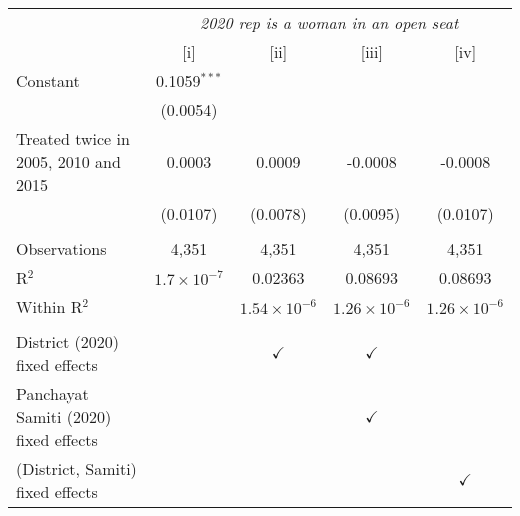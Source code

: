 
\begingroup
\centering
\begin{tabular}{lcccc}
   \toprule
    & \multicolumn{4}{c}{\textit{2020 rep is a woman in an open seat}}\\
                                         & [i]                  & [ii]                  & [iii]                 & [iv]\\  
   \midrule 
   Constant                              & 0.1059$^{***}$       &                       &                       &   \\   
                                         & (0.0054)             &                       &                       &   \\   
   Treated twice in 2005, 2010 and 2015  & 0.0003               & 0.0009                & -0.0008               & -0.0008\\   
                                         & (0.0107)             & (0.0078)              & (0.0095)              & (0.0107)\\   
    \\
   Observations                          & 4,351                & 4,351                 & 4,351                 & 4,351\\  
   R$^2$                                 & $1.7\times 10^{-7}$  & 0.02363               & 0.08693               & 0.08693\\  
   Within R$^2$                          &                      & $1.54\times 10^{-6}$  & $1.26\times 10^{-6}$  & $1.26\times 10^{-6}$\\   
    \\
   District (2020) fixed effects         &                      & $\checkmark$          & $\checkmark$          & \\  
   Panchayat Samiti (2020) fixed effects &                      &                       & $\checkmark$          & \\  
   (District, Samiti) fixed effects      &                      &                       &                       & $\checkmark$\\   
   \bottomrule
\end{tabular}
\par\endgroup


